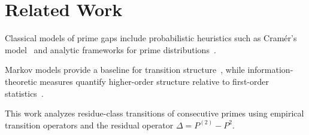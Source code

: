 \section{Related Work}

Classical models of prime gaps include probabilistic heuristics such as Cramér's model~\cite{cramer1936} and analytic frameworks for prime distributions~\cite{hardy1979}.

Markov models provide a baseline for transition structure~\cite{aldous1983}, while information-theoretic measures quantify higher-order structure relative to first-order statistics~\cite{cover2006}.


This work analyzes residue-class transitions of consecutive primes using empirical transition operators and the residual operator $\Delta = P^{(2)} - P^2$.